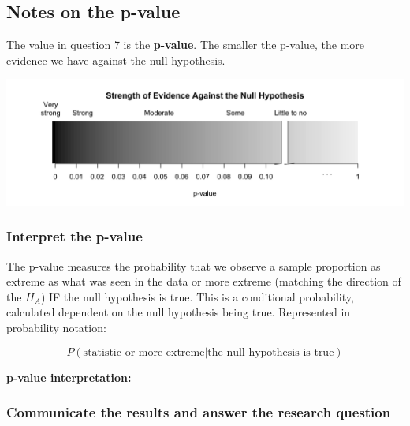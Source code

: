 \documentclass[
]{report}
\begin{document}
\subsection*{Notes on the p-value}\label{notes-on-the-p-value}

The value in question 7 is the \textbf{p-value}. The smaller the p-value, the more evidence we have against the null hypothesis.

\vspace{1.5in}

\begin{center}\includegraphics[width=0.9\linewidth]{images/soe_gradient_gray} \end{center}

\subsubsection*{Interpret the p-value}\label{interpret-the-p-value}

The p-value measures the probability that we observe a sample proportion as extreme as what was seen in the data or more extreme (matching the direction of the \(H_A\)) IF the null hypothesis is true. This is a conditional probability, calculated dependent on the null hypothesis being true. Represented in probability notation:

\[P(\text{statistic or more extreme|the null hypothesis is true})\]

\textbf{p-value interpretation:}

\vspace{1in}

\subsubsection*{Communicate the results and answer the research question}\label{communicate-the-results-and-answer-the-research-question}
\end{document}
